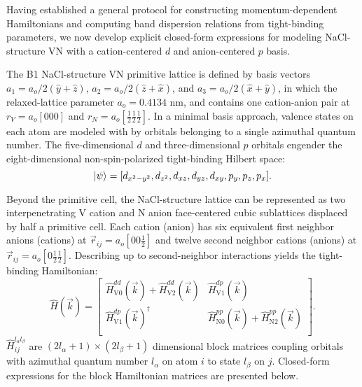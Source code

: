 \documentclass[twocolumn,showpacs,preprintnumbers,superscriptaddress,prb,floatfix,aps,10pt]{revtex4-1}
\newcommand*{\ham}{\hat{H}}
\newcommand*{\bondvec}{\vec{r}_{ij}}
\begin{document}
Having established a general protocol for constructing momentum-dependent Hamiltonians and computing band dispersion relations from tight-binding parameters, we now develop explicit closed-form expressions for modeling NaCl-structure VN with a cation-centered $d$ and anion-centered $p$ basis. 

The B1 NaCl-structure VN primitive lattice is defined by basis vectors $a_1 = a_o/2 (\hat{y} + \hat{z})$, $a_2 = a_o/2 (\hat{z} + \hat{x})$, and $a_3 = a_o/2 (\hat{x} + \hat{y})$, in which the relaxed-lattice parameter $a_o = 0.4134$ nm, and contains one cation-anion pair at $r_V = a_o[000]$ and $r_N = a_o[\frac{1}{2}\frac{1}{2}\frac{1}{2}]$. In a minimal basis approach, valence states on each atom are modeled with by orbitals belonging to a single azimuthal quantum number. The five-dimensional $d$ and three-dimensional $p$ orbitals engender the eight-dimensional non-spin-polarized tight-binding Hilbert space:
\begin{equation}
\label{eq:hilbert}
\ket{\psi} =
[ d_{x^2-y^2},
  d_{z^2}, 
  d_{xz},
  d_{yz},
  d_{xy},
  p_{y},
  p_{z},
  p_{x}] .
\end{equation}

Beyond the primitive cell, the NaCl-structure lattice can be represented as two interpenetrating V cation and N anion face-centered cubic sublattices displaced by half a primitive cell. Each cation (anion) has six equivalent first neighbor anions (cations) at $\bondvec = a_o [0 0 \frac{1}{2}]$ and twelve second neighbor cations (anions) at $\bondvec = a_o[0 \frac{1}{2} \frac{1}{2}]$. Describing up to second-neighbor interactions yields the tight-binding Hamiltonian:
%
\begin{equation}
\label{eq:ham_explicit}
\ham(\vec{k}) = 
\begin{bmatrix}
\ham_{\textrm{V}0}^{dd}(\vec{k}) + \ham_{\textrm{V}2}^{dd}(\vec{k}) &\ham_{\textrm{V}1}^{dp}(\vec{k}) \\
\ham_{\textrm{V}1}^{dp}(\vec{k})^{\dagger} & \ham_{\textrm{N}0}^{pp}(\vec{k}) + \ham_{\textrm{N}2}^{pp}(\vec{k}) \\
\end{bmatrix} .
\end{equation}
%
$\ham_{ij}^{l_\alpha l_\beta}$ are $(2l_\alpha+1)\times(2l_\beta+1)$ dimensional block matrices coupling orbitals with azimuthal quantum number $l_\alpha$ on atom $i$ to state $l_\beta$ on $j$. Closed-form expressions for the block Hamiltonian matrices are presented below.
\end{document}
